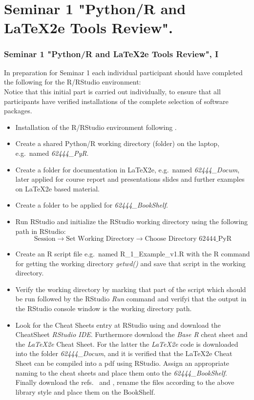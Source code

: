 \documentclass{beamer}
\begin{document}
\section{Seminar 1 "Python/R and \LaTeX2e \hspace*{0.5mm} Tools Review".}
\begin{frame}[fragile, label={ToolReview}]
\frametitle{Seminar 1 "Python/R and \LaTeX2e \hspace*{0.5mm} Tools Review", I}
\tiny{
In preparation for Seminar 1 each individual participant should have completed the following for the R/RStudio environment:\\
Notice that this initial part is carried out individually, to ensure that all participants have verified installations of the complete selection of software packages.
\begin{itemize}
\item Installation of the R/RStudio environment following \cite{R2022}.
\item Create a shared Python/R working directory (folder) on the laptop, e.g.\ named \emph{62444\_PyR}.
\item Create a folder for documentation in \LaTeX2e, e.g.\ named \emph{62444\_Docum}, later applied for course report and presentations slides and further examples on \LaTeX2e based material.
\item Create a folder to be applied for \emph{62444\_BookShelf}.
\item Run RStudio and initialize the RStudio working directory using the following path in RStudio:
\[ \text {Session} \rightarrow \text{Set Working Directory} \rightarrow \text{Choose Directory 62444\_PyR} \]
\item Create an R script file e.g.\ named R\_1\_Example\_v1.R with the R command for getting the working directory \emph{getwd()} and
save that script in the working directory.
\item  Verify the working directory by marking that part of the script which  should be run followed by the RStudio \emph{Run} command and verifyi  that the output in the RStudio console window is  the working directory path.
\item Look for the Cheat Sheets entry at RStudio using \cite{RStudioCheatSheets2022} and download the CheatSheet \emph{RStudio IDE}. Furthermore download the \emph{Base R} cheat sheet and the \emph{\LaTeX2e} Cheat Sheet. For the latter the \emph{\LaTeX2e} code is downloaded into the folder \emph{62444\_Docum}, and it is verified that the \LaTeX2e Cheat Sheet can be compiled into a pdf using RStudio. Assign an appropriate naming to the cheat sheets and place them onto the \emph{62444\_BookShelf}. Finally download the refs.\ \cite{Torfs2014} and \cite{Oetiker2021}, rename the files according to the above library style and place them on the BookShelf.

\end{itemize}}
\end{frame}
\end{document}
